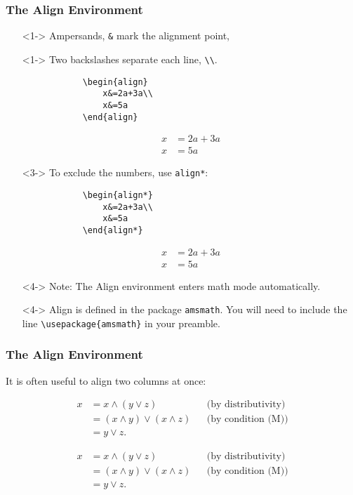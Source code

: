 \begin{frame}[fragile]
\frametitle{The Align Environment}
\begin{itemize}
	\item[]<1-> Ampersands, \verb|&| mark the alignment point,
	\item[]<1-> Two backslashes separate each line, \verb|\\|.
	\pause
	 \begin{multicols}{2}
	 	\begin{verbatim}
			\begin{align}
				x&=2a+3a\\
				x&=5a
			\end{align}
		\end{verbatim}
	\columnbreak
		\begin{align}
			x&=2a+3a\\
			x&=5a
		\end{align}
	\end{multicols}
	\item[]<3-> To exclude the numbers, use \verb|align*|:
	 \begin{multicols}{2}
	 	\begin{verbatim}
			\begin{align*}
				x&=2a+3a\\
				x&=5a
			\end{align*}
		\end{verbatim}
	\columnbreak
		\begin{align*}
			x&=2a+3a\\
			x&=5a
		\end{align*}
	\end{multicols}
	\item[]<4-> Note: The Align environment enters math mode automatically.
        \item[]<4-> Align is defined in the package \verb|amsmath|. You will need to include the line \verb|\usepackage{amsmath}| in your preamble.
\end{itemize}
\end{frame}

\begin{frame}[fragile]
\frametitle{The Align Environment}

It is often useful to align two columns at once:

	\begin{align*} 
		x&=x \wedge (y \vee z) &&\text{(by distributivity)} \\ 
		&= (x \wedge y) \vee (x \wedge z) && \text{(by condition (M))}\\ 
		&= y \vee z.
	\end{align*}

\pause
\begin{verbatimtab}
	\begin{align*} 
	   x&=x \wedge (y \vee z) &&\text{(by distributivity)} \\ 
	   &= (x \wedge y) \vee (x \wedge z) 
	      && \text{(by condition (M))}\\ 
	   &= y \vee z.
	\end{align*}
\end{verbatimtab}
\end{frame}

